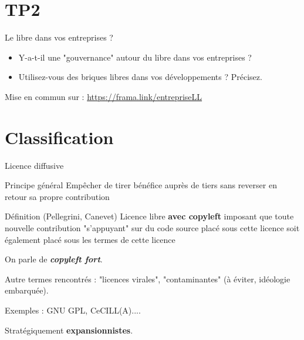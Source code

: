 \documentclass{beamer}
\begin{document}
\section{TP2}

\begin{frame}{Le libre dans vos entreprises ?}

  \begin{itemize}
  \item Y-a-t-il une "gouvernance" autour du libre dans vos
    entreprises ?
  \item Utilisez-vous des briques libres dans vos développements ? Précisez.
  \end{itemize}
Mise en commun sur :
\url{https://frama.link/entrepriseLL}
  
\end{frame}


\section{Classification}


\begin{frame}{Licence diffusive}

  \begin{block}{Principe général}
    Empêcher de tirer bénéfice auprès de tiers sans reverser en retour sa propre contribution    
  \end{block}

  \begin{alertblock}{Définition (Pellegrini, Canevet)}
    Licence libre \textbf{avec copyleft} imposant que toute nouvelle contribution "s'appuyant" sur du code source placé sous cette licence soit également placé sous les termes de cette licence
   \end{alertblock}

On parle de \textit{\textbf{copyleft fort}}.

Autre termes rencontrés : "licences virales", "contaminantes" (à éviter, idéologie embarquée).
  
Exemples : GNU GPL, CeCILL(A)....

Stratégiquement \textbf{expansionnistes}.
\end{frame}

\end{document}
